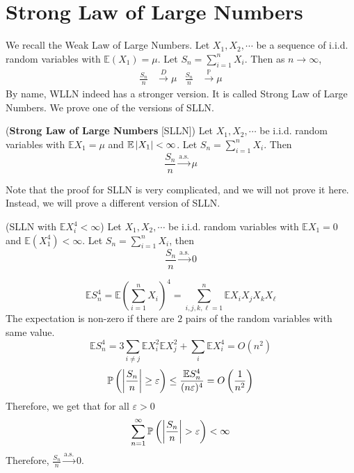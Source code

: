 \documentclass{huhtakm-template-book}
\newcommand{\prob}{\mathbb{P}}
\newcommand{\expect}{\mathbb{E}}
\begin{document}
\section{Strong Law of Large Numbers}
We recall the Weak Law of Large Numbers. Let $X_{1},X_{2},\cdots$ be a sequence of i.i.d. random variables with $\expect(X_{1})=\mu$. Let $S_{n}=\sum_{i=1}^{n}X_{i}$. Then as $n\to\infty$,
\begin{align*}
    \frac{S_{n}}{n}&\xrightarrow{D}\mu & \frac{S_{n}}{n}&\xrightarrow{\prob}\mu
\end{align*}
By name, WLLN indeed has a stronger version. It is called Strong Law of Large Numbers. We prove one of the versions of SLLN.
\begin{thm}(\textbf{Strong Law of Large Numbers} [SLLN])
    Let $X_{1},X_{2},\cdots$ be i.i.d. random variables with $\expect X_{1}=\mu$ and $\expect\abs{X_{1}}<\infty$. Let $S_{n}=\sum_{i=1}^{n}X_{i}$. Then
    \begin{equation*}
        \frac{S_{n}}{n}\xrightarrow{\text{a.s.}}\mu
    \end{equation*}
\end{thm}
Note that the proof for SLLN is very complicated, and we will not prove it here. Instead, we will prove a different version of SLLN.
\newpage
\begin{thm}(SLLN with $\expect X_{i}^{4}<\infty$)
    Let $X_{1},X_{2},\cdots$ be i.i.d. random variables with $\expect X_{1}=0$ and $\expect(X_{1}^{4})<\infty$. Let $S_{n}=\sum_{i=1}^{n}X_{i}$, then
    \begin{equation*}
        \frac{S_{n}}{n}\xrightarrow{\text{a.s.}}0
    \end{equation*}
\end{thm}
\begin{proofing}
    \begin{equation*}
        \expect S_{n}^{4}=\expect\left(\sum_{i=1}^{n}X_{i}\right)^{4}=\sum_{i,j,k,\ell=1}^{n}\expect X_{i}X_{j}X_{k}X_{\ell}
    \end{equation*}
    The expectation is non-zero if there are $2$ pairs of the random variables with same value.
    \begin{equation*}
        \expect S_{n}^{4}=3\sum_{i\neq j}\expect X_{i}^{2}\expect X_{j}^{2}+\sum_{i}\expect X_{i}^{4}=O(n^{2})
    \end{equation*}
    \begin{equation*}
        \prob\left(\abs{\frac{S_{n}}{n}}\geq\varepsilon\right)\leq\frac{\expect S_{n}^{4}}{(n\varepsilon)^{4}}=O\left(\frac{1}{n^{2}}\right)
    \end{equation*}
    Therefore, we get that for all $\varepsilon>0$
    \begin{equation*}
        \sum_{n=1}^{\infty}\prob\left(\abs{\frac{S_{n}}{n}}>\varepsilon\right)<\infty
    \end{equation*}
    Therefore, $\frac{S_{n}}{n}\xrightarrow{\text{a.s.}}0$.
\end{proofing}
\end{document}
